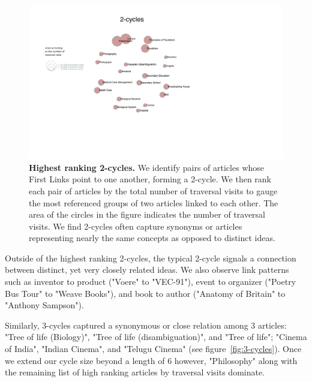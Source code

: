 \documentclass[pre,twocolumn,twoside,superscriptaddress,floatfix, aps, 10pt]{revtex4-1}
\begin{document}
\begin{figure}[tp!]
  \centering	
  \includegraphics[width=\textwidth]{graphics/2_cycles.pdf}
  \caption{
    \textbf{Highest ranking 2-cycles.}
    We identify pairs of articles whose First Links point to one another, forming
    a 2-cycle. We then rank each pair of articles by the total number of 
    traversal visits to gauge the most referenced groups of two articles linked
    to each other. The area of the circles in the figure indicates the number of traversal visits. We find 2-cycles often capture synonyms or articles representing nearly the 
    same concepts as opposed to distinct ideas.
  }
  \label{fig:2-cycles}
\end{figure}

Outside of the highest ranking 2-cycles, the typical 2-cycle signals a connection between distinct, yet very closely related ideas. 
We also observe link patterns such as inventor to product ("Voere" to "VEC-91"), event to organizer ("Poetry Bus Tour" to "Weave Books"), and book to author ("Anatomy of Britain" to "Anthony Sampson").

Similarly, 3-cycles captured a synonymous or close relation among 3 articles: "Tree of life (Biology)", "Tree of life (disambiguation)", 
and "Tree of life"; "Cinema of India", "Indian Cinema", and "Telugu Cinema"
(see figure~\ref{fig:3-cycles}).
Once we extend our cycle size beyond a length of 6 however, 
"Philosophy" along with the remaining list of high ranking articles by traversal visits dominate.
\end{document}
